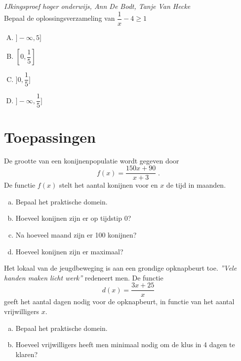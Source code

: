 \documentclass[12pt,twoside,a4paper]{article}
\begin{document}
\begin{oefening}{\scriptsize\em IJkingsproef hoger onderwijs, Ann De Bodt, Tanje Van Hecke}\\
Bepaal de oplossingsverzameling van $\dfrac{1}{x} - 4 \geq 1$\\
\begin{enumerate}[(A)]
  \itemsep.5em
  \item $]-\infty, 5]$
  \item $[0, \dfrac{1}{5}]$
  \item $]0, \dfrac{1}{5}]$
  \item $]-\infty, \dfrac{1}{5}]$
\end{enumerate}
\end{oefening}

\cleardoublepage
\section{Toepassingen}

\begin{oefening}
De grootte van een konijnenpopulatie wordt gegeven door
$$f(x)=\dfrac{150x+90}{x+3}\;.$$
De functie $f(x)$ stelt het aantal konijnen voor en $x$ de tijd in maanden.
\begin{enumerate}[(a)]
  \item Bepaal het praktische domein.
  \item Hoeveel konijnen zijn er op tijdstip 0?
  \item Na hoeveel maand zijn er 100 konijnen?
  \item Hoeveel konijnen zijn er maximaal?
\end{enumerate}
\end{oefening}

\begin{oefening}
Het lokaal van de jeugdbeweging is aan een grondige opknapbeurt toe. {\em ''Vele handen maken licht werk''} redeneert men. De functie
$$d(x)=\dfrac{3x+25}{x}$$
geeft het aantal dagen nodig voor de opknapbeurt, in functie van het aantal vrijwilligers $x$.
\begin{enumerate}[(a)]
  \item Bepaal het praktische domein.
  \item Hoeveel vrijwilligers heeft men minimaal nodig om de klus in 4 dagen te klaren?
\end{enumerate}
\end{oefening}
\end{document}
